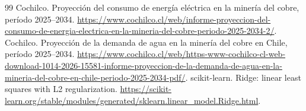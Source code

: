 \begin{thebibliography}{99}
 Cochilco. Proyección del consumo de energía eléctrica en la minería del cobre, período 2025--2034. \url{https://www.cochilco.cl/web/informe-proyeccion-del-consumo-de-energia-electrica-en-la-mineria-del-cobre-periodo-2025-2034-2/}.
 Cochilco. Proyección de la demanda de agua en la minería del cobre en Chile, período 2025--2034. \url{https://www.cochilco.cl/web/https-www-cochilco-cl-web-download-1014-2026-15581-informe-proyeccion-de-la-demanda-de-agua-en-la-mineria-del-cobre-en-chile-periodo-2025-2034-pdf/}.
 scikit-learn. Ridge: linear least squares with L2 regularization. \url{https://scikit-learn.org/stable/modules/generated/sklearn.linear_model.Ridge.html}.
\end{thebibliography}
